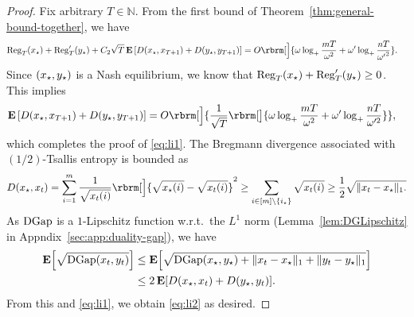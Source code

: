 \begin{proof}
    Fix arbitrary $T \in \mathbb{N}$.
    From the first bound of Theorem~\ref{thm:general-bound-together},
    we have
    \begin{align*}
        &
        \Rr_T(\xstar)
        +
        \Rc_T(\ystar)
        +
        C_2 \sqrt{T} \E \left[
            D(x_{\star}, x_{T+1})
            +
            D(y_{\star}, y_{T+1})
        \right]
        =
        O \rbrm[\Big]{
        {
            \omegar
            \log_+ \frac{
                mT
            }{
                \omegar^2
            }
        }
        +
        { 
            \omegac
            \log_+ \frac{
                nT
            }{
                {\omegac}^2
            }
        }
        }.
    \end{align*}
    Since $(x_{\star}, y_{\star})$ is a Nash equilibrium, we know that 
    $\mathrm{Reg}_T(x_{\star}) + \mathrm{Reg}'_T(y_{\star}) \geq 0$.
    This implies
    \begin{align*}
        \E \left[
            D(x_{\star}, x_{T+1})
            +
            D(y_{\star}, y_{T+1})
        \right]
        &
        =
        O \rbrm[\Big]{
            \frac{1}{\sqrt{T}}
            \rbrm[\big]{
                \omegar \log_{+} {
                    \frac{mT}{\omegar^2}
                }
                +
                \omegac \log_{+} {
                    \frac{nT}{\omegac^2}
                }
            }
        },
    \end{align*}
    which completes the proof of \eqref{eq:li1}.
    The Bregmann divergence associated with $(1/2)$-Tsallis entropy 
    is bounded as
    \begin{align*}
            D( \xstar, x_t )
        =
            \sum_{i=1}^m
            \frac{1}{\sqrt{x_t(i)}}\rbrm[\Big]{
                \sqrt{\xstar(i)} - \sqrt{x_t(i)}
            }^2
        \ge
            \sum_{i \in [m] \setminus \{ \istar \}}
            \sqrt{x_t(i)}
        \ge
        \frac{1}{2}
            \sqrt{
                \| x_t - \xstar \|_1.
            }
    \end{align*}
    As $\operatorname{DGap}$ is a $1$-Lipschitz function w.r.t.~the $L^1$ norm (Lemma~\ref{lem:DGLipschitz} in Appndix~\ref{sec:app:duality-gap}),
    we have
    \begin{align*}
        \E \sbr{
            \sqrt{
                \DG( x_t, y_t )
            }
        }
        &
        \le
        \E \sbr{
            \sqrt{
                \DG( \xstar, \ystar )
                +
                \| x_t - \xstar \|_1
                +
                \| y_t - \ystar \|_1
            }
        }
        \\
        &
        \le
        2 
        \E \sbr{
            D(\xstar, x_t)
            +
            D(\ystar, y_t)
        }.
    \end{align*}
    From this and \eqref{eq:li1},
    we obtain \eqref{eq:li2} as desired.
\end{proof}


